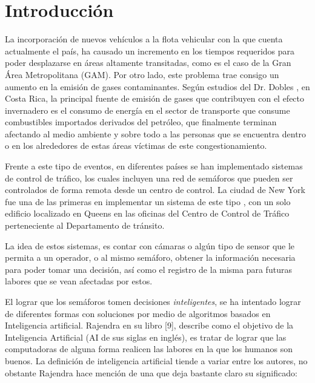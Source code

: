 \chapter*{Introducci\'{o}n}
	\label{chap:introduction}
 

		 
		La incorporaci\'{o}n de nuevos veh\'{i}culos a la flota vehicular con la que cuenta
	actualmente el pa\'{i}s, ha causado un incremento en los tiempos requeridos para
	poder desplazarse en \'{a}reas altamente transitadas, como es el caso de la Gran
	\'{A}rea Metropolitana (GAM). Por otro lado, este problema trae consigo un aumento
	en la emisi\'{o}n de gases contaminantes. Seg\'{u}n estudios del Dr. Dobles
	\cite{Robles2011} , en Costa Rica, la principal fuente de emisi\'{o}n de gases que contribuyen con el efecto invernadero es el consumo de energ\'{i}a en el sector de transporte que consume combustibles importados derivados del petr\'{o}leo, que finalmente terminan afectando al medio ambiente y sobre todo a las personas que se encuentra dentro o en los alrededores de estas \'{a}reas v\'{i}ctimas de este congestionamiento.
	
		Frente a este tipo de eventos, en diferentes pa\'{i}ses se han implementado
	sistemas de control de tr\'{a}fico, los cuales incluyen una red de sem\'{a}foros que
	pueden ser controlados de forma remota desde un centro de control. La ciudad de
	New York fue una de las primeras en implementar un sistema de este tipo
	\cite{Greenman1998}, con un solo edificio localizado en Queens en las oficinas
	del Centro de Control de Tr\'{a}fico perteneciente al Departamento de tr\'{a}nsito.
	
		La idea de estos sistemas, es contar con c\'{a}maras o alg\'{u}n tipo de sensor que le
	permita a un operador, o al mismo sem\'{a}foro, obtener la informaci\'{o}n necesaria
	para poder tomar una decisi\'{o}n, as\'{i} como el registro de la misma para futuras
	labores que se vean afectadas por estos.
	
		El lograr que los sem\'{a}foros tomen decisiones \textit{inteligentes}, se ha
	intentado lograr de diferentes formas con soluciones por medio de  algoritmos basados en Inteligencia
	artificial. Rajendra en su libro [9], describe como el objetivo de la
	Inteligencia Artificial (AI de sus siglas en ingl\'{e}s), es tratar de lograr que
	las computadoras de alguna forma realicen las labores en la que los humanos son
	buenos. La definici\'{o}n de inteligencia artificial tiende a variar entre los
	autores, no obstante Rajendra hace menci\'{o}n de una que deja bastante claro su significado:

